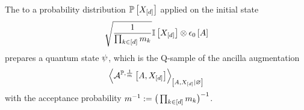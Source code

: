 \begin{lemma}
    \label{lem:actCircuitAncilla}
    The \activationCircuit{} to a probability distribution $\mathbb{P}\left[X_{[d]}\right]$ applied on the initial state
    \begin{align*}
        \sqrt{\frac{1}{\prod_{k\in[d]}m_{k}}}\mathbb{I}\left[X_{[d]}\right] \otimes \epsilon_{0}\left[A\right]
    \end{align*}
    prepares a quantum state $\psi$, which is the Q-sample of the ancilla augmentation
    \begin{align*}
        \left\langle \mathcal{A}^{\mathbb{P},\frac{1}{m}}\left[A,X_{[d]}\right]\right\rangle_{\left[ A,X_{[d]} | \varnothing \right]}
    \end{align*}
    with the acceptance probability $m^{-1}:= \big(\prod_{k\in[d]}m_{k}\big)^{-1}$.
\end{lemma}
